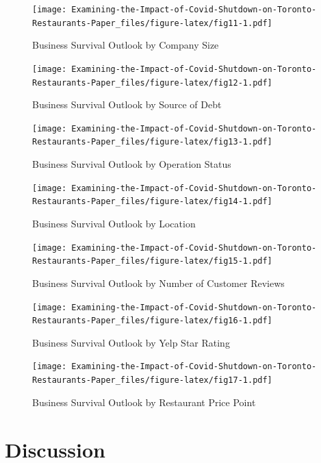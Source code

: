 \documentclass[
]{article}
\begin{document}
\begin{figure}
\centering
\texttt{[image: Examining-the-Impact-of-Covid-Shutdown-on-Toronto-Restaurants-Paper\_files/figure-latex/fig11-1.pdf]}
\caption{\label{fig:fig11}Business Survival Outlook by Company Size}
\end{figure}

\begin{figure}
\centering
\texttt{[image: Examining-the-Impact-of-Covid-Shutdown-on-Toronto-Restaurants-Paper\_files/figure-latex/fig12-1.pdf]}
\caption{\label{fig:fig12}Business Survival Outlook by Source of Debt}
\end{figure}

\begin{figure}
\centering
\texttt{[image: Examining-the-Impact-of-Covid-Shutdown-on-Toronto-Restaurants-Paper\_files/figure-latex/fig13-1.pdf]}
\caption{\label{fig:fig13}Business Survival Outlook by Operation Status}
\end{figure}

\begin{figure}
\centering
\texttt{[image: Examining-the-Impact-of-Covid-Shutdown-on-Toronto-Restaurants-Paper\_files/figure-latex/fig14-1.pdf]}
\caption{\label{fig:fig14}Business Survival Outlook by Location}
\end{figure}

\begin{figure}
\centering
\texttt{[image: Examining-the-Impact-of-Covid-Shutdown-on-Toronto-Restaurants-Paper\_files/figure-latex/fig15-1.pdf]}
\caption{\label{fig:fig15}Business Survival Outlook by Number of Customer Reviews}
\end{figure}

\begin{figure}
\centering
\texttt{[image: Examining-the-Impact-of-Covid-Shutdown-on-Toronto-Restaurants-Paper\_files/figure-latex/fig16-1.pdf]}
\caption{\label{fig:fig16}Business Survival Outlook by Yelp Star Rating}
\end{figure}

\begin{figure}
\centering
\texttt{[image: Examining-the-Impact-of-Covid-Shutdown-on-Toronto-Restaurants-Paper\_files/figure-latex/fig17-1.pdf]}
\caption{\label{fig:fig17}Business Survival Outlook by Restaurant Price Point}
\end{figure}

\newpage

\hypertarget{discussion}{%
\section{Discussion}\label{discussion}}
\end{document}
